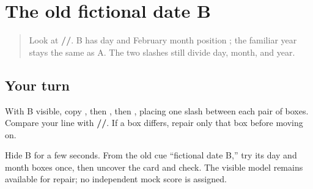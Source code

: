 \section[\texorpdfstring{\pa{੨੫}/\pa{੦੨}/\pa{੨੦੨੫} (fictional February date B)}{੨੫/੦੨/੨੦੨੫ (fictional February date B)}]{The old fictional date B}

\label{lesson:PA-R169-date-b-again}



\begin{quote}
Look at \textbf{//}. B has day \textbf{} and February month position \textbf{}; the familiar year \textbf{} stays the same as A. The two slashes still divide day, month, and year.
\end{quote}

\subsection*{Your turn}
With B visible, copy \textbf{}, then \textbf{}, then \textbf{}, placing one slash between each pair of boxes. Compare your line with \textbf{//}. If a box differs, repair only that box before moving on.

\begin{tcolorbox}[breakable,colback=teal!4,colframe=teal!35!black,title={Before you move on}]
Hide B for a few seconds. From the old cue “fictional date B,” try its day and month boxes once, then uncover the card and check. The visible model remains available for repair; no independent mock score is assigned.
\end{tcolorbox}
